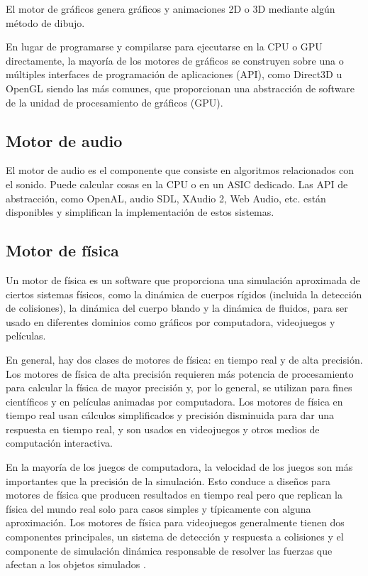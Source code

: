 El motor de gráficos genera gráficos y animaciones 2D o 3D mediante algún método de dibujo.

En lugar de programarse y compilarse para ejecutarse en la CPU o GPU directamente, la mayoría de los motores de gráficos se construyen sobre una o múltiples interfaces de programación de aplicaciones (API), como Direct3D u OpenGL siendo las más comunes, que proporcionan una abstracción de software de la unidad de procesamiento de gráficos (GPU).

\subsection{Motor de audio}

El motor de audio es el componente que consiste en algoritmos relacionados con el sonido. Puede calcular cosas en la CPU o en un ASIC dedicado. Las API de abstracción, como OpenAL, audio SDL, XAudio 2, Web Audio, etc. están disponibles y simplifican la implementación de estos sistemas.

\subsection{Motor de física}

Un motor de física es un software que proporciona una simulación aproximada de ciertos sistemas físicos, como la dinámica de cuerpos rígidos (incluida la detección de colisiones), la dinámica del cuerpo blando y la dinámica de fluidos, para ser usado en diferentes dominios como gráficos por computadora, videojuegos y películas.

En general, hay dos clases de motores de física: en tiempo real y de alta precisión. Los motores de física de alta precisión requieren más potencia de procesamiento para calcular la física de mayor precisión y, por lo general, se utilizan para fines científicos y en películas animadas por computadora. Los motores de física en tiempo real usan cálculos simplificados y precisión disminuida para dar una respuesta en tiempo real, y son usados en videojuegos y otros medios de computación interactiva.

En la mayoría de los juegos de computadora, la velocidad de los juegos son más importantes que la precisión de la simulación. Esto conduce a diseños para motores de física que producen resultados en tiempo real pero que replican la física del mundo real solo para casos simples y típicamente con alguna aproximación. Los motores de física para videojuegos generalmente tienen dos componentes principales, un sistema de detección y respuesta a colisiones y el componente de simulación dinámica responsable de resolver las fuerzas que afectan a los objetos simulados \cite{JasonGregory-GameEngineArchitecture}.

